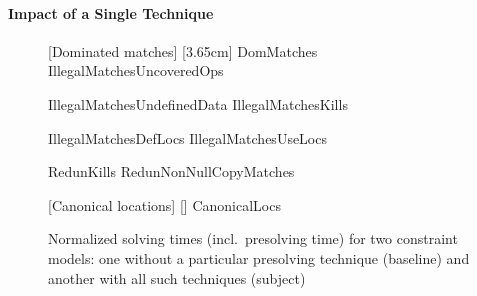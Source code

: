 \paragraph{Impact of a Single Technique}


\begin{figure}
  \centering

                      [Dominated matches]%
                      [3.65cm]%
                      {DomMatches}%
  \hfill%
                      {IllegalMatchesUncoveredOps}

  \vspace{\betweensubfigures}

                      {IllegalMatchesUndefinedData}%
  \hfill%
                      {IllegalMatchesKills}%

  \vspace{\betweensubfigures}

                      {IllegalMatchesDefLocs}%
  \hfill%
                      {IllegalMatchesUseLocs}

  \vspace{\betweensubfigures}

                      {RedunKills}%
  \hfill%
                      {RedunNonNullCopyMatches}

  \vspace{\betweensubfigures}

                      [Canonical locations]%
                      [\linewidth]%
                      {CanonicalLocs}

  \caption[%
            Set of plots for evaluating each presolving technique's impact on
            solving time%
          ]%
          {%
            Normalized solving times (incl.\ presolving time) for two
            constraint models: one without a particular presolving technique
            (baseline) and another with all such techniques (subject)%
          }
\end{figure}

